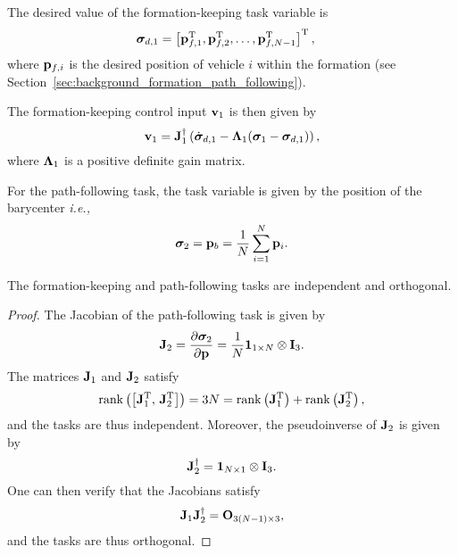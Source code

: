 The desired value of the formation-keeping task variable is
\begin{align}
    \bm{\sigma}_{d, 1} &= \left[\mathbf{p}_{f, 1}^{\mathrm{T}}, \mathbf{p}_{f, 2}^{\mathrm{T}}, \ldots, \mathbf{p}_{f, N-1}^{\mathrm{T}}\right]^{\mathrm{T}},
    \label{eq:background_NSB_formation_reference}
\end{align}
where $\mathbf{p}_{f, i}$ is the desired position of vehicle $i$ within the formation (see Section~\ref{sec:background_formation_path_following}).

The formation-keeping control input $\mathbf{v}_1$ is then given by
\begin{equation}
    \mathbf{v}_1 = \mathbf{J}_1^{\dagger} \left(\dot{\bm{\sigma}}_{d, 1} - \bm{\Lambda}_1 (\bm{\sigma}_1 - \bm{\sigma}_{d, 1})\right),
    \label{eq:background_NSB_formation_velocity}
\end{equation}
where $\bm{\Lambda}_1$ is a positive definite gain matrix.

For the path-following task, the task variable is given by the position of the barycenter \emph{i.e.,}
\begin{equation}
    \bm{\sigma}_2 = \mathbf{p}_b = \frac{1}{N} \sum_{i=1}^{N} \mathbf{p}_i.
\end{equation}

\begin{prop}
    The formation-keeping and path-following tasks are independent and orthogonal.
\end{prop}
\begin{proof}
    The Jacobian of the path-following task is given by
    \begin{equation}
        \mathbf{J}_2 = \frac{\partial \bm{\sigma}_2}{\partial \mathbf{p}} = \frac{1}{N} \mathbf{1}_{1 \times N} \otimes \mathbf{I}_3.
    \end{equation}
    The matrices $\mathbf{J}_1$ and $\mathbf{J}_2$ satisfy
    \begin{equation}
        \operatorname*{rank} \left(\left[\mathbf{J}_1^{\mathrm{T}},\, \mathbf{J}_2^{\mathrm{T}}\right]\right) = 3N = \operatorname*{rank} \left(\mathbf{J}_1^{\mathrm{T}}\right) + \operatorname*{rank} \left(\mathbf{J}_2^{\mathrm{T}}\right),
    \end{equation}
    and the tasks are thus independent.
    Moreover, the pseudoinverse of $\mathbf{J}_2$ is given by
    \begin{equation}
        \mathbf{J}_2^{\dagger} = \mathbf{1}_{N \times 1} \otimes \mathbf{I}_3.
    \end{equation}
    One can then verify that the Jacobians satisfy
    \begin{equation}
        \mathbf{J}_1 \mathbf{J}_2^{\dagger} = \mathbf{O}_{3(N-1) \times 3},
    \end{equation}
    and the tasks are thus orthogonal.
\end{proof}

